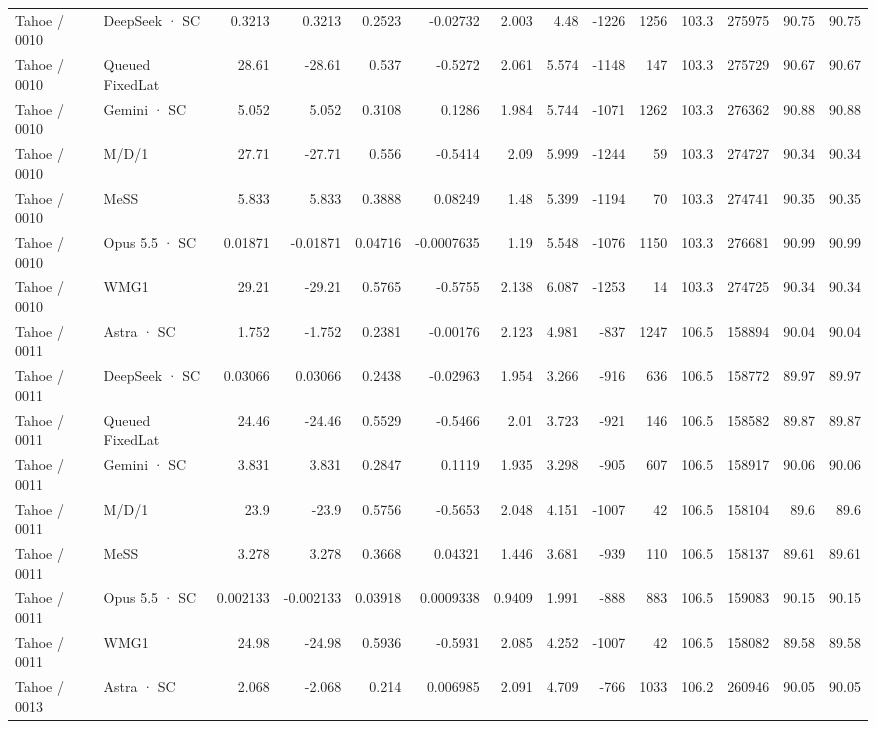 \begin{tabular}{llrrrrrrrrrrrr}
Tahoe / 0010 & DeepSeek · SC & 0.3213 & 0.3213 & 0.2523 & -0.02732 & 2.003 & 4.48 & -1226 & 1256 & 103.3 & 275975 & 90.75 & 90.75 \\
Tahoe / 0010 & Queued FixedLat & 28.61 & -28.61 & 0.537 & -0.5272 & 2.061 & 5.574 & -1148 & 147 & 103.3 & 275729 & 90.67 & 90.67 \\
Tahoe / 0010 & Gemini · SC & 5.052 & 5.052 & 0.3108 & 0.1286 & 1.984 & 5.744 & -1071 & 1262 & 103.3 & 276362 & 90.88 & 90.88 \\
Tahoe / 0010 & M/D/1 & 27.71 & -27.71 & 0.556 & -0.5414 & 2.09 & 5.999 & -1244 & 59 & 103.3 & 274727 & 90.34 & 90.34 \\
Tahoe / 0010 & MeSS & 5.833 & 5.833 & 0.3888 & 0.08249 & 1.48 & 5.399 & -1194 & 70 & 103.3 & 274741 & 90.35 & 90.35 \\
Tahoe / 0010 & Opus 5.5 · SC & 0.01871 & -0.01871 & 0.04716 & -0.0007635 & 1.19 & 5.548 & -1076 & 1150 & 103.3 & 276681 & 90.99 & 90.99 \\
Tahoe / 0010 & WMG1 & 29.21 & -29.21 & 0.5765 & -0.5755 & 2.138 & 6.087 & -1253 & 14 & 103.3 & 274725 & 90.34 & 90.34 \\
Tahoe / 0011 & Astra · SC & 1.752 & -1.752 & 0.2381 & -0.00176 & 2.123 & 4.981 & -837 & 1247 & 106.5 & 158894 & 90.04 & 90.04 \\
Tahoe / 0011 & DeepSeek · SC & 0.03066 & 0.03066 & 0.2438 & -0.02963 & 1.954 & 3.266 & -916 & 636 & 106.5 & 158772 & 89.97 & 89.97 \\
Tahoe / 0011 & Queued FixedLat & 24.46 & -24.46 & 0.5529 & -0.5466 & 2.01 & 3.723 & -921 & 146 & 106.5 & 158582 & 89.87 & 89.87 \\
Tahoe / 0011 & Gemini · SC & 3.831 & 3.831 & 0.2847 & 0.1119 & 1.935 & 3.298 & -905 & 607 & 106.5 & 158917 & 90.06 & 90.06 \\
Tahoe / 0011 & M/D/1 & 23.9 & -23.9 & 0.5756 & -0.5653 & 2.048 & 4.151 & -1007 & 42 & 106.5 & 158104 & 89.6 & 89.6 \\
Tahoe / 0011 & MeSS & 3.278 & 3.278 & 0.3668 & 0.04321 & 1.446 & 3.681 & -939 & 110 & 106.5 & 158137 & 89.61 & 89.61 \\
Tahoe / 0011 & Opus 5.5 · SC & 0.002133 & -0.002133 & 0.03918 & 0.0009338 & 0.9409 & 1.991 & -888 & 883 & 106.5 & 159083 & 90.15 & 90.15 \\
Tahoe / 0011 & WMG1 & 24.98 & -24.98 & 0.5936 & -0.5931 & 2.085 & 4.252 & -1007 & 42 & 106.5 & 158082 & 89.58 & 89.58 \\
Tahoe / 0013 & Astra · SC & 2.068 & -2.068 & 0.214 & 0.006985 & 2.091 & 4.709 & -766 & 1033 & 106.2 & 260946 & 90.05 & 90.05 \\

\end{tabular}
